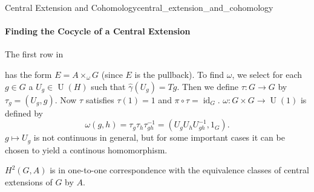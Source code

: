 \documentclass{article}
\begin{document}
\begin{example}{Central Extension and Cohomology}{central_extension_and_cohomology}
    \paragraph*{Finding the Cocycle of a Central Extension}
    The first row in
    \begin{center}
    \end{center}
    has the form $E = A \times_\omega G$ (since $E$ is the pullback).
    To find $\omega$, we select for each $g\in G$ a $U_g\in \operatorname{U}(H)$ such that $\hat{\gamma}(U_g) = Tg$.
    Then we define $\tau:G\rightarrow G$ by $\tau_g = (U_g,g)$.
    Now $\tau$ satisfies $\tau(1) = 1$ and $\pi\circ \tau = \operatorname{id}_G$.
    $\omega:G\times G \rightarrow \operatorname{U}(1)$ is defined by
    \[ \omega(g,h) = \tau_g \tau_h \tau^{-1}_{gh} = (U_g U_h U^{-1}_{gh}, 1_G). \]
    $g\mapsto U_g$ is not continuous in general, but for some important cases it can be chosen to yield a continous homomorphism.
    \par
    $H^2(G,A)$ is in one-to-one correspondence with the equivalence classes of central extensions of $G$ by $A$.
\end{example}

% 
% 
\end{document}
